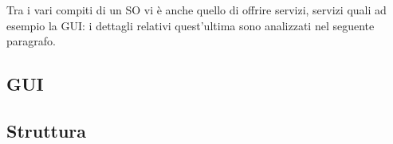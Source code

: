 Tra i vari compiti di un SO vi è anche quello di offrire servizi, servizi quali ad esempio la GUI: i dettagli relativi quest'ultima sono analizzati nel seguente paragrafo.

\subsection{GUI}


\subsection{Struttura}
